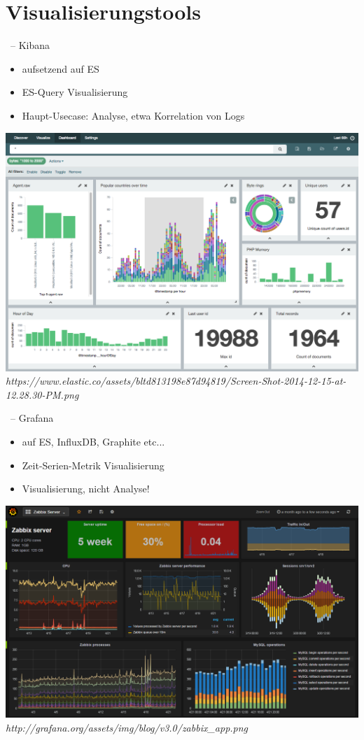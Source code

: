 \documentclass{beamer}
\begin{document}
\section{Visualisierungstools}

\begin{frame}{\insertsection\ -- Kibana}
	\begin{itemize}
		\item aufsetzend auf ES
		\item ES-Query Visualisierung
		\item Haupt-Usecase: Analyse, etwa Korrelation von Logs
	\end{itemize}
	\includegraphics[width=0.7\linewidth,page=1]{img/kibana.png}\\
	\fontsize{4pt}{7.2}\selectfont
	\textit{https://www.elastic.co/assets/bltd813198e87d94819/Screen-Shot-2014-12-15-at-12.28.30-PM.png}
\end{frame}

\begin{frame}{\insertsection\ -- Grafana}
	\begin{itemize}
		\item auf ES, InfluxDB, Graphite etc...
		\item Zeit-Serien-Metrik Visualisierung
		\item Visualisierung, nicht Analyse!
	\end{itemize}
	\includegraphics[width=0.8\linewidth,page=1]{img/grafana.png}\\
	\fontsize{4pt}{7.2}\selectfont
	\textit{http://grafana.org/assets/img/blog/v3.0/zabbix\_app.png}
\end{frame}
\end{document}
